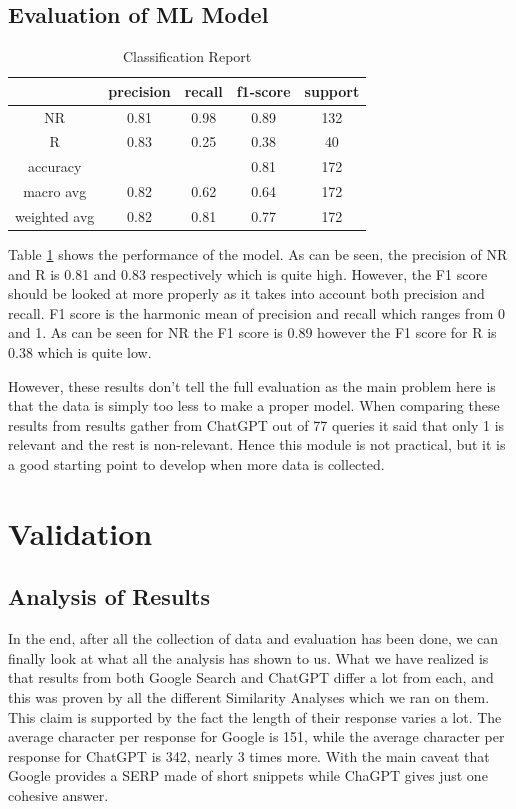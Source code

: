 \documentclass[50pt]{usiinfbachelorproject}
\begin{document}
\subsection{Evaluation of ML Model}
\begin{table}[H]
  \centering
  \begin{tabular}{|c||c|c|c|c|}
    \hline
    & precision & recall & f1-score & support \\
    \hline
    \hline
    NR & 0.81 & 0.98 & 0.89 & 132 \\
    R & 0.83 & 0.25 & 0.38 & 40 \\
    accuracy & \null & \null & 0.81 & 172 \\
    macro avg & 0.82 & 0.62 & 0.64 & 172 \\
    weighted avg & 0.82 & 0.81 & 0.77 & 172 \\
    \hline
  \end{tabular}
  \caption{Classification Report}
  \label{tab:classification_report}
\end{table}

Table \ref{tab:classification_report} shows the performance of the model. As can be seen, the precision of NR and R is 0.81 and 0.83 respectively which is quite high. However, the F1 score should be looked at more properly as it takes into account both precision and recall. F1 score is the harmonic mean of precision and recall which ranges from 0 and 1. As can be seen for NR the F1 score is 0.89 however the F1 score for R is 0.38 which is quite low. 

However, these results don’t tell the full evaluation as the main problem here is that the data is simply too less to make a proper model. When comparing these results from results gather from ChatGPT out of 77 queries it said that only 1 is relevant and the rest is non-relevant. Hence this module is not practical, but it is a good starting point to develop when more data is collected.


\section{Validation}
\label{sec:validation}
\subsection{Analysis of Results}
In the end, after all the collection of data and evaluation has been done, we can finally look at what all the analysis has shown to us. What we have realized is that results from both Google Search and ChatGPT differ a lot from each, and this was proven by all the different Similarity Analyses which we ran on them. This claim is supported by the fact the length of their response varies a lot. The average character per response for Google is 151, while the average character per response for ChatGPT is 342, nearly 3 times more. With the main caveat that Google provides a SERP made of short snippets while ChaGPT gives just one cohesive answer.
\end{document}
